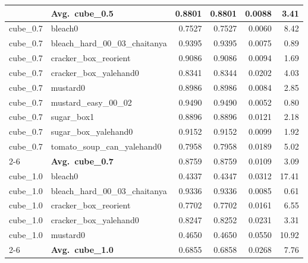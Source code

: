 \begin{longtable}{llrrrr}
  & \textbf{Avg.~cube_0.5} & 0.8801 & 0.8801 & 0.0088 & 3.41 \\
  \midrule
  cube_0.7 & bleach0 & 0.7527 & 0.7527 & 0.0060 & 8.42 \\
  cube_0.7 & bleach\_hard\_00\_03\_chaitanya & 0.9395 & 0.9395 & 0.0075 & 0.89 \\
  cube_0.7 & cracker\_box\_reorient & 0.9086 & 0.9086 & 0.0094 & 1.69 \\
  cube_0.7 & cracker\_box\_yalehand0 & 0.8341 & 0.8344 & 0.0202 & 4.03 \\
  cube_0.7 & mustard0 & 0.8986 & 0.8986 & 0.0084 & 2.85 \\
  cube_0.7 & mustard\_easy\_00\_02 & 0.9490 & 0.9490 & 0.0052 & 0.80 \\
  cube_0.7 & sugar\_box1 & 0.8896 & 0.8896 & 0.0121 & 2.18 \\
  cube_0.7 & sugar\_box\_yalehand0 & 0.9152 & 0.9152 & 0.0099 & 1.92 \\
  cube_0.7 & tomato\_soup\_can\_yalehand0 & 0.7958 & 0.7958 & 0.0189 & 5.02 \\
  \cmidrule{2-6}
  & \textbf{Avg.~cube_0.7} & 0.8759 & 0.8759 & 0.0109 & 3.09 \\
  \midrule
  cube_1.0 & bleach0 & 0.4337 & 0.4347 & 0.0312 & 17.41 \\
  cube_1.0 & bleach\_hard\_00\_03\_chaitanya & 0.9336 & 0.9336 & 0.0085 & 0.61 \\
  cube_1.0 & cracker\_box\_reorient & 0.7702 & 0.7702 & 0.0161 & 6.55 \\
  cube_1.0 & cracker\_box\_yalehand0 & 0.8247 & 0.8252 & 0.0231 & 3.31 \\
  cube_1.0 & mustard0 & 0.4650 & 0.4650 & 0.0550 & 10.92 \\
  \cmidrule{2-6}
  & \textbf{Avg.~cube_1.0} & 0.6855 & 0.6858 & 0.0268 & 7.76 \\
  \midrule
\bottomrule
\end{longtable}